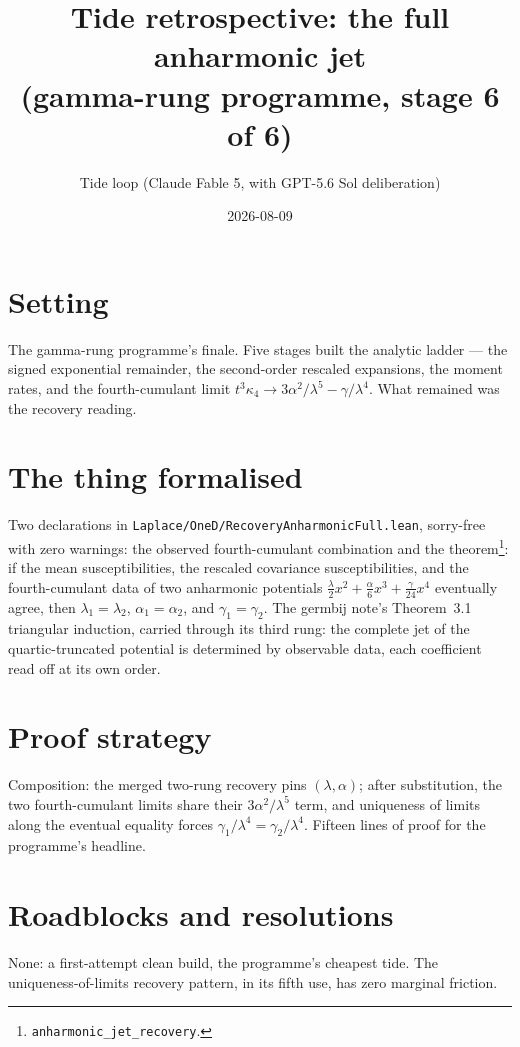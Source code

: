 \documentclass[11pt]{article}
\title{Tide retrospective: the full anharmonic jet\\
(gamma-rung programme, stage 6 of 6)}
\author{Tide loop (Claude Fable 5, with GPT-5.6 Sol deliberation)}
\date{2026-08-09}
\begin{document}
\maketitle

\section{Setting}

The gamma-rung programme's finale. Five stages built the analytic
ladder --- the signed exponential remainder, the second-order rescaled
expansions, the moment rates, and the fourth-cumulant limit
$t^3\kappa_4 \to 3\alpha^2/\lambda^5 - \gamma/\lambda^4$. What remained
was the recovery reading.

\section{The thing formalised}

Two declarations in \texttt{Laplace/OneD/RecoveryAnharmonicFull.lean},
sorry-free with zero warnings: the observed fourth-cumulant combination
and the theorem\footnote{\texttt{anharmonic\_jet\_recovery}.}: if the
mean susceptibilities, the rescaled covariance susceptibilities, and
the fourth-cumulant data of two anharmonic potentials
$\tfrac{\lambda}{2}x^2 + \tfrac{\alpha}{6}x^3 + \tfrac{\gamma}{24}x^4$
eventually agree, then $\lambda_1 = \lambda_2$, $\alpha_1 = \alpha_2$,
and $\gamma_1 = \gamma_2$. The germbij note's Theorem~3.1 triangular
induction, carried through its third rung: the complete jet of the
quartic-truncated potential is determined by observable data, each
coefficient read off at its own order.

\section{Proof strategy}

Composition: the merged two-rung recovery pins $(\lambda, \alpha)$;
after substitution, the two fourth-cumulant limits share their
$3\alpha^2/\lambda^5$ term, and uniqueness of limits along the eventual
equality forces $\gamma_1/\lambda^4 = \gamma_2/\lambda^4$. Fifteen
lines of proof for the programme's headline.

\section{Roadblocks and resolutions}

None: a first-attempt clean build, the programme's cheapest tide. The
uniqueness-of-limits recovery pattern, in its fifth use, has zero
marginal friction.
\end{document}
